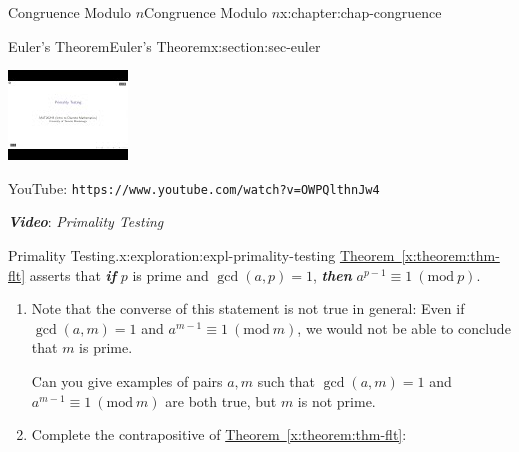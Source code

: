 \documentclass[oneside,10pt,]{book}
\newcommand{\xreffont}{\relax}
\newcommand{\mono}[1]{\texttt{#1}}
\newcommand{\alert}[1]{\textbf{\textit{#1}}}
\numberwithin{equation}{section}
\newlength{\qrsize}
\newlength{\previewwidth}
\newcommand{\Mod}[1]{\ \left(\mathrm{mod}\ #1\right)}
\begin{document}
\begin{chapterptx}{Congruence Modulo \(n\)}{}{Congruence Modulo \(n\)}{}{}{x:chapter:chap-congruence}
\begin{sectionptx}{Euler's Theorem}{}{Euler's Theorem}{}{}{x:section:sec-euler}
\begin{sidebyside}{1}{0}{0}{0}
\begin{sbspanel}{1}
\begin{tcbraster}[raster columns=2, raster column skip=1pt, raster halign=center, raster force size=false, raster left skip=0pt, raster right skip=0pt]
\begin{tcolorbox}[previewstyle, width=\previewwidth]
\includegraphics[width=0.80\linewidth,height=\qrsize,keepaspectratio]{images/video-primality-testing.jpg}%
\end{tcolorbox}%
\begin{tcolorbox}[qrstyle]%
{\hypersetup{urlcolor=black}}%
\end{tcolorbox}%
\begin{tcolorbox}[captionstyle]%
\small YouTube: \mono{https://www.youtube.com/watch?v=OWPQlthnJw4}\end{tcolorbox}%
\end{tcbraster}%
\end{sbspanel}%
\end{sidebyside}%
\par
\alert{Video}: \emph{Primality Testing}%
\begin{exploration}{Primality Testing.}{x:exploration:expl-primality-testing}%
\hyperref[x:theorem:thm-flt]{Theorem~{\xreffont\ref{x:theorem:thm-flt}}} asserts that \alert{if} \(p\) is prime and \(\gcd(a,p)=1\), \alert{then} \(a^{p-1} \equiv 1 \Mod{p}\).%
\begin{enumerate}[font=\bfseries,label=(\alph*),ref=\alph*]
\item{}Note that the converse of this statement is not true in general: Even if \(\gcd(a,m) = 1\) and \(a^{m-1} \equiv 1 \Mod{m}\), we would not be able to conclude that \(m\) is prime.%
\par
Can you give examples of pairs \(a, m\) such that \(\gcd(a,m) = 1\) and \(a^{m-1} \equiv 1 \Mod{m}\) are both true, but \(m\) is not prime.%
\item{}Complete the contrapositive of \hyperref[x:theorem:thm-flt]{Theorem~{\xreffont\ref{x:theorem:thm-flt}}}:%
\begin{sidebyside}{1}{0.1}{0.1}{0}%

\end{sidebyside}
\end{enumerate}
\end{exploration}
\end{sectionptx}
\end{chapterptx}
\end{document}
